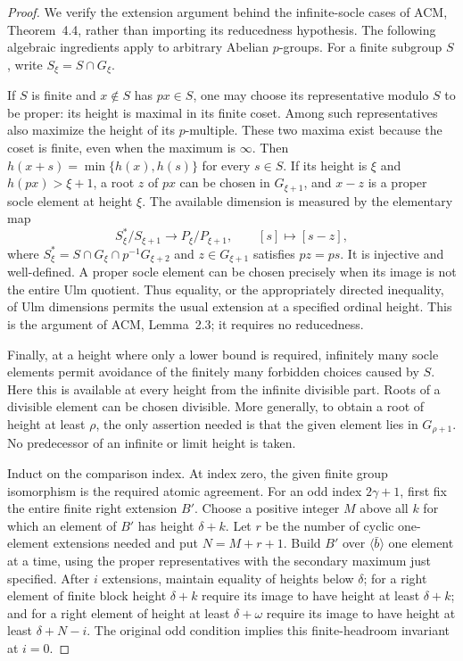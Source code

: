 \documentclass[11pt]{article}
\begin{document}
\begin{proof}
We verify the extension argument behind the infinite-socle cases of
ACM, Theorem~4.4, rather than importing its reducedness hypothesis.
The following algebraic ingredients apply to arbitrary Abelian
$p$-groups. For a finite subgroup $S$, write $S_\xi=S\cap G_\xi$.

If $S$ is finite and $x\notin S$ has $px\in S$, one may choose
its representative modulo $S$ to be proper: its height is maximal
in its finite coset. Among such representatives also maximize the
height of its $p$-multiple. These two maxima exist because the coset
is finite, even when the maximum is $\infty$. Then
$h(x+s)=\min\{h(x),h(s)\}$ for every $s\in S$.
If its height is $\xi$ and $h(px)>\xi+1$, a root $z$ of $px$
can be chosen in $G_{\xi+1}$, and $x-z$ is a proper socle
element at height $\xi$. The available dimension is measured by
the elementary map
\[
 S_\xi^*/S_{\xi+1}\longrightarrow P_\xi/P_{\xi+1},
 \qquad [s]\longmapsto[s-z],
\]
where $S_\xi^*=S\cap G_\xi\cap p^{-1}G_{\xi+2}$ and
$z\in G_{\xi+1}$ satisfies $pz=ps$. It is injective and
well-defined. A proper socle element can be chosen precisely when
its image is not the entire Ulm quotient. Thus equality, or the
appropriately directed inequality, of Ulm dimensions permits the
usual extension at a specified ordinal height. This is the
argument of ACM, Lemma~2.3; it requires no reducedness.

Finally, at a height where only a lower bound is required, infinitely
many socle elements permit avoidance of the finitely many forbidden
choices caused by $S$. Here this is available at every height from
the infinite divisible part. Roots of a divisible element can be
chosen divisible. More generally, to obtain a root of height at
least $\rho$, the only assertion needed is that the given element
lies in $G_{\rho+1}$. No predecessor of an infinite or limit height
is taken.

Induct on the comparison index. At index zero, the given finite
group isomorphism is the required atomic agreement. For an odd
index $2\gamma+1$, first fix the entire finite right extension $B'$.
Choose a positive integer $M$ above all $k$ for which an element
of $B'$ has height $\delta+k$. Let $r$ be the number of cyclic
one-element extensions needed and put $N=M+r+1$. Build $B'$ over
$\langle\bar b\rangle$ one element at a time, using the proper
representatives with the secondary maximum just specified.
After $i$ extensions, maintain equality of heights below $\delta$;
for a right element of finite block height $\delta+k$ require its
image to have height at least $\delta+k$; and for a right element
of height at least $\delta+\omega$ require its image to have height
at least $\delta+N-i$. The original odd condition implies this
finite-headroom invariant at $i=0$.


\end{proof}
\end{document}
